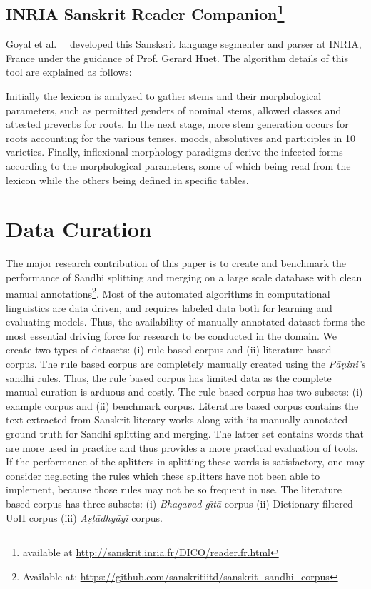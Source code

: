 \documentclass[11pt]{article}
\begin{document}
\subsection{INRIA Sanskrit Reader Companion\footnote{available at \url{http://sanskrit.inria.fr/DICO/reader.fr.html}}} Goyal et al.~\cite{huet2003}~\cite{goyal2013completeness}  developed this Sansksrit language segmenter and parser at INRIA, France under the guidance of Prof. Gerard Huet. The algorithm details of this tool are explained as follows:

 Initially the lexicon is analyzed to gather stems and their morphological parameters, such as permitted genders of nominal stems, allowed classes and attested preverbs for roots.  In the next stage, more stem generation occurs for roots accounting for the various tenses, moods, absolutives and participles in 10 varieties. Finally, inflexional  morphology  paradigms  derive  the  infected  forms  according  to  the morphological parameters, some of which being read from the lexicon while the others being defined in specific tables. 



\section{Data Curation}
The major research contribution of this paper is to create and benchmark the performance of Sandhi splitting and merging on a large scale database with clean manual annotations\footnote{Available at: \url{https://github.com/sanskritiitd/sanskrit_sandhi_corpus}}. Most of the automated algorithms in computational linguistics are data driven, and requires labeled data both for learning and evaluating models. Thus, the availability of manually annotated dataset forms the most essential driving force for research to be conducted in the domain. We create two types of datasets: (i) rule based corpus and (ii) literature based corpus. The rule based corpus are completely manually created using the \textit{P\={a}\d{n}ini's} sandhi rules. Thus, the rule based corpus has limited data as the complete manual curation is arduous and costly. The rule based corpus has two subsets: (i) example corpus and (ii) benchmark corpus. 
Literature based corpus contains the text extracted from Sanskrit literary works along with its manually annotated ground truth for Sandhi splitting and merging. The latter set contains words that are more used in practice and thus provides a more practical evaluation of tools. If the performance of the splitters in splitting these words is satisfactory, one may consider neglecting the rules which these splitters have not been able to implement, because those rules may not be so frequent in use. The literature based corpus has three subsets: (i)  \textit{Bhagavad-g\={\i}t\={a}} corpus
(ii) Dictionary filtered UoH corpus
(iii) \textit{A\d{s}\d{t}\={a}dhy\={a}y\={\i}} corpus.
\end{document}
